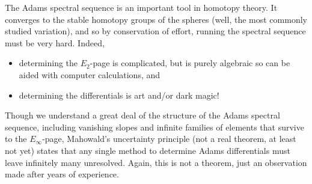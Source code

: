 The Adams spectral sequence is an important tool in homotopy theory. It converges to the stable homotopy groups of
the spheres (well, the most commonly studied variation), and so by conservation of effort, running the spectral
sequence must be very hard. Indeed,
\begin{itemize}
	\item determining the $E_2$-page is complicated, but is purely algebraic so can be aided with computer
	calculations, and
	\item determining the differentials is art and/or dark magic!
\end{itemize}
Though we understand a great deal of the structure of the Adams spectral sequence, including vanishing slopes and
infinite families of elements that survive to the $E_\infty$-page, Mahowald's uncertainty principle (not a real
theorem, at least not yet) states that any single method to determine Adams differentials must leave infinitely
many unresolved. Again, this is not a theorem, just an observation made after years of experience.

